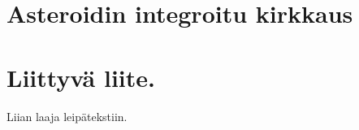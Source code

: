 \documentclass[12pt,a4paper,titlepage]{article}
\begin{document}
\section{Asteroidin integroitu kirkkaus}





\appendix
\newpage
\section{Liittyvä liite.} \label{koodi}
Liian laaja leipätekstiin.
\end{document}
